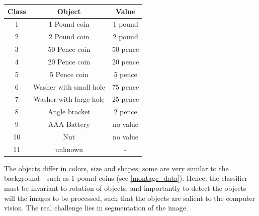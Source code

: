 \documentclass[main.tex]{subfiles}
\begin{document}
\begin{center}
\begin{tabular}{ |c|c|c| }
  \hline
  Class & Object & Value\\
  \hline
  1 & 1 Pound coin          & 1 pound\\
  2 & 2 Pound coin          & 2 pound\\
  3 & 50 Pence coin         & 50 pence\\
  4 & 20 Pence coin         & 20 pence\\
  5 & 5 Pence coin          & 5 pence\\
  6 & Washer with small hole & 75 pence\\
  7 & Washer with large hole & 25 pence\\
  8 & Angle bracket         & 2 pence\\
  9 & AAA Battery           & no value \\
  10 & Nut                  & no value \\
  11 & unknown              & - \\
  \hline
\end{tabular}
\end{center}

The objects differ in colors, size and shapes; some are very similar to the background - such as 1 pound coins (see \autoref{montage_data}). Hence, the classifier must be invariant to rotation of objects, and importantly to detect the objects will the images to be processed, such that the objects are salient to the computer vision. The real challenge lies in segmentation of the image.
\end{document}
